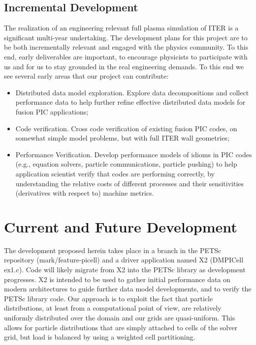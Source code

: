 \documentclass[review]{siamart}
\begin{document}
\subsection{Incremental Development}
\label{sec:id}

The realization of an engineering relevant full plasma simulation of ITER is a significant multi-year undertaking.
The development plans for this project are to be both incrementally relevant and engaged with the physics community.
To this end, early deliverables are important, to encourage physicists to participate with us and for us to stay grounded in the real engineering demands.
To this end we see several early areas that our project can contribute:
\begin{itemize}
\item Distributed data model exploration. Explore data decompositions and collect performance data to help further refine effective distributed data models for fusion PIC applications;
\item Code verification. Cross code verification of existing fusion PIC codes, on somewhat simple model problems, but with full ITER wall geometries;
\item Performance Verification.  Develop performance models of idioms in PIC codes (e.g., equation solvers, particle communications, particle pushing) to help application scientist verify that codes are performing correctly, by understanding the relative costs of different processes and their sensitivities (derivatives with respect to) machine metrics.
\end{itemize}
 

\section{Current and Future Development}
\label{sec:x2}

The development proposed herein takes place in a branch in the PETSc repository (mark/feature-picell) and a driver application named X2 (DMPICell ex1.c).
Code will likely migrate from X2 into the PETSc library as development progresses.
X2 is intended to be used to gather initial performance data on modern architectures to guide further data model developments, and to verify the PETSc library code.
Our approach is to exploit the fact that particle distributions, at least from a computational point of view, are relatively uniformly distributed over the domain and our grids are quasi-uniform.
This allows for particle distributions that are simply attached to cells of the solver grid, but load is balanced by using a weighted cell partitioning.
\end{document}
